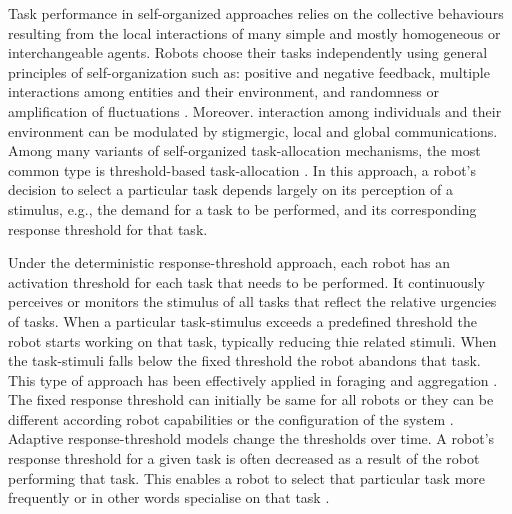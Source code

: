 \documentclass[journal]{IEEEtran}
\begin{document}

Task performance in self-organized approaches relies on the collective behaviours resulting from the local interactions of many simple and mostly homogeneous or interchangeable agents. Robots choose their tasks independently using general principles of self-organization such as: positive and negative feedback, multiple interactions among entities and their environment, and randomness or amplification of fluctuations \cite{Camazine+2001}. Moreover. interaction among individuals and their environment can be modulated by stigmergic, local and global communications.  Among many variants of self-organized task-allocation mechanisms, the most common type is threshold-based task-allocation \cite{Bonabeau+1999}. In this approach, a robot's decision to select a particular task depends largely on its perception of a stimulus, e.g., the demand for a task to be performed, and its corresponding response threshold for that task.

Under the deterministic response-threshold approach, each robot has an activation threshold for each task that needs to be performed. It continuously perceives or monitors the stimulus of all tasks that reflect the relative urgencies of tasks. When a particular task-stimulus exceeds a predefined threshold the robot starts working on that task, typically reducing thie related stimuli. When the task-stimuli falls below the fixed threshold the robot abandons that task. This type of approach has been effectively applied in foraging \cite{Liu+2007,Krieger+2000} and aggregation \cite{Agassounon+2002}. The fixed response threshold can initially be same for all robots \cite{Jones+2000} or they can be different according robot capabilities or the configuration of the system \cite{Krieger+2000}. Adaptive response-threshold models change the thresholds over time.  A robot's response threshold for a given task is often decreased as a result of the robot performing that task.  This enables a robot to select that particular task more frequently or in other words specialise on that task \cite{Bonabeau+1999,Agassounon+2002}.
\end{document}
